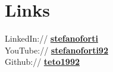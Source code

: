 \documentclass[a4paper]{deedy-resume} %
\begin{document}
\begin{minipage}[t]{0.33\textwidth}
\sectionspace %


\section{Links} 

LinkedIn:// \href{https://it.linkedin.com/pub/stefano-forti/89/5a6/348}{\bf stefanoforti} \\
YouTube:// \href{https://www.youtube.com/user/tetus1992/videos}{\bf stefanoforti92} \\
Github:// \href{https://github.com/teto1992/}{\bf teto1992} \\

\sectionspace %


\end{minipage} %
\hfill
%
%
\end{document}
